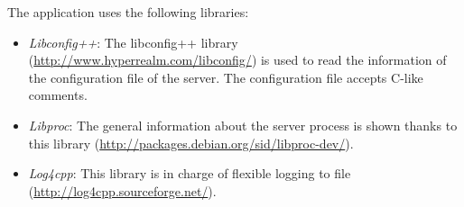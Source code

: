 The application uses the following libraries:

\begin{itemize}
	\item \textit{Libconfig++}: The libconfig++ library (\href{http://www.hyperrealm.com/libconfig/}{http://www.hyperrealm.com/libconfig/}) is used to read the
information of the configuration file of the server. The configuration 
file accepts C-like comments.
	\item \textit{Libproc}: The general information about the server process is shown thanks to this library (\href{http://packages.debian.org/sid/libproc-dev/}{http://packages.debian.org/sid/libproc-dev/}).
	\item \textit{Log4cpp}: This library is in charge of flexible logging to file (\href{http://log4cpp.sourceforge.net/}{http://log4cpp.sourceforge.net/}).
\end{itemize}



